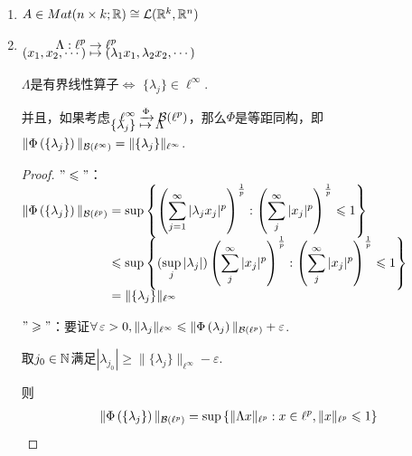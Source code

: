 \begin{instance}[有界线性算子]
    \begin{enumerate}[label=(\arabic*)]
        \item $A\in Mat(n\times k;\mathbb{R})\cong \mcal{L}(\mathbb{R}^k,\mathbb{R}^n)$
        \item $\setjot[-6]\begin{aligned}[t]
            \Lambda:\ell^p &\to\ell^p \\
            (x_1,x_2,\cdots) &\mapsto (\lambda_1 x_1,\lambda_2 x_2,\cdots)
        \end{aligned} $\par
        \begin{claim*}
            $\Lambda$是有界线性算子$\iff$ $\{\lambda_j\}\in\ell^\infty$.
        \end{claim*}
        并且，如果考虑$\setjot[-6]\begin{aligned}[t]
            \ell^\infty &\xrightarrow{\Phi} \mcal{B}(\ell^p) \\ 
            \{\lambda_j\}&\mapsto \Lambda
        \end{aligned}$，那么$\Phi$是等距同构，即$\|\Phi\left(\{\lambda_j\}\right)\|_{\mcal{B}(\ell^\infty)}=\|\{\lambda_j\}\|_{\ell^\infty}$.
        \begin{proof}
            $"\leq "$：$\setjot[-2]\begin{aligned}[t]
                \|\Phi\left(\{\lambda_j\}\right)\|_{\mcal{B}(\ell^p)}&=\sup\left\{\left(\sum_{j=1}^\infty|\lambda_jx_j|^p\right)^\frac{1}{p}:\left(\sum_j^\infty|x_j|^p\right)^\frac{1}{p}\leq 1\right\}\\
                &\leq\sup\left\{(\sup_j|\lambda_j|)\left(\sum_j^\infty|x_j|^p\right)^\frac{1}{p}:\left(\sum_j^\infty|x_j|^p\right)^\frac{1}{p}\leq 1\right\} \\
                &=\|\{\lambda_j\}\|_{\ell^\infty}
            \end{aligned}$ \par
            $"\geq "$：要证$\forall\,\varepsilon>0,\|{\lambda_j}\|_{\ell^\infty}\leq \|\Phi\left({\lambda_j}\right)\|_{\mcal{B}(\ell^p)}+\varepsilon$.\par
            取$j_0\in\mb{N}$满足$|\lambda_{j_0}|\geq \|\{\lambda_j\}\|_{\ell^\infty}-\varepsilon$.\par
            则\begin{align*}
                \|\Phi\left(\{\lambda_j\}\right)\|_{\mcal{B}(\ell^p)}&=\sup\left\{\|\Lambda x\|_{\ell^p}:x\in\ell^p,\|x\|_{\ell^p}\leq 1\right\} \\

\end{align*}
\end{proof}
\end{enumerate}
\end{instance}
